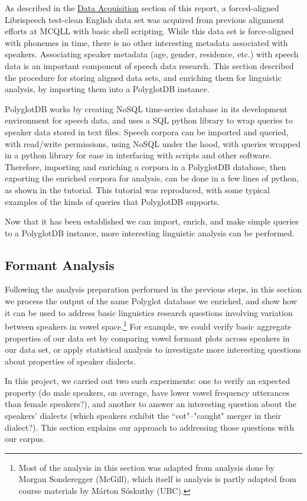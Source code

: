 \documentclass[11pt]{article}
\begin{document}
As described in the \hyperlink{section.22}{Data Acquisition} section of this report, a forced-aligned Librispeech test-clean English data set was acquired from previous alignment efforts at MCQLL with basic shell scripting. While this data set is force-aligned with phonemes in time, there is no other interesting metadata associated with speakers. Associating speaker metadata (age, gender, residence, etc.) with speech data is an important component of speech data research. This section described the procedure for storing aligned data sets, and enriching them for linguistic analysis, by importing them into a PolyglotDB instance. 

PolyglotDB works by creating NoSQL time-series database in its development environment for speech data, and uses a SQL python library to wrap queries to speaker data stored in text files. Speech corpora can be imported and queried, with read/write permissions, using NoSQL under the hood, with queries wrapped in a python library for ease in interfacing with scripts and other software. Therefore, importing and enriching a corpora in a PolyglotDB database, then exporting the enriched corpora for analysis, can be done in a few lines of python, as shown in the tutorial. This tutorial was reproduced, with some typical examples of the kinds of queries that PolyglotDB supports.

Now that it has been established we can import, enrich, and make simple queries to a PolyglotDB instance, more interesting linguistic analysis can be performed.

\subsection{Formant Analysis}

Following the analysis preparation performed in the previous steps, in this section we process the output of the same Polyglot database we enriched, and show how it can be used to address basic linguistics research questions involving variation between speakers in vowel space.\footnote{Most of the analysis in this section was adapted from analysis done by Morgan Sonderegger (McGill), which itself is analysis is partly adapted from course materials by Márton Sóskuthy (UBC).} For example, we could verify basic aggregate properties of our data set by comparing vowel formant plots across speakers in our data set, or apply statistical analysis to investigate more interesting questions about properties of speaker dialects.

In this project, we carried out two such experiments: one to verify an expected property (do male speakers, on average, have lower vowel frequency utterances than female speakers?), and another to answer an interesting question about the speakers' dialects (which speakers exhibit the ``cot"--"caught" merger in their dialect?). This section explains our approach to addressing those questions with our corpus.
\end{document}

